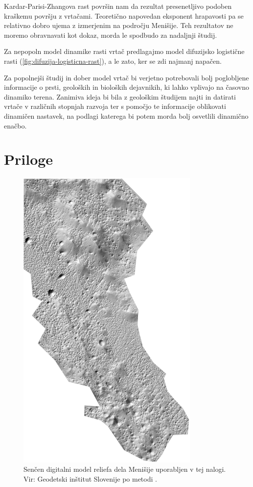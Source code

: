 \documentclass[a4paper, twoside, 12pt]{book}
\begin{document}
    Kardar-Parisi-Zhangova rast površin nam da rezultat presenetljivo podoben kraškemu površju z vrtačami. Teoretično napovedan eksponent hrapavosti pa se relativno dobro ujema z izmerjenim na področju Menišije. Teh rezultatov ne moremo obravnavati kot dokaz, morda le spodbudo za nadaljnji študij.

    Za nepopoln model dinamike rasti vrtač predlagajmo model difuzijsko logistične rasti (\ref{fig:difuzija-logisticna-rast}), a le zato, ker se zdi najmanj napačen.

    Za popolnejši študij in dober model vrtač bi verjetno potrebovali bolj poglobljene informacije o prsti, geoloških in bioloških dejavnikih, ki lahko vplivajo na časovno dinamiko terena. Zanimiva ideja bi bila z geološkim študijem najti in datirati vrtače v različnih stopnjah razvoja ter s pomočjo te informacije oblikovati dinamičen nastavek, na podlagi katerega bi potem morda bolj osvetlili dinamično enačbo.

\chapter{Priloge}

 \begin{figure}[H]
    \begin{center}
      \includegraphics[width=9cm]{slike/menisija-relief}
    \end{center}
    \caption{Senčen digitalni model reliefa dela Menišije uporabljen v tej nalogi. Vir: Geodetski inštitut Slovenije \cite{LAK} po metodi \cite{Kobler20079}.}
    \label{fig:menisija-relief}
  \end{figure}
\end{document}

